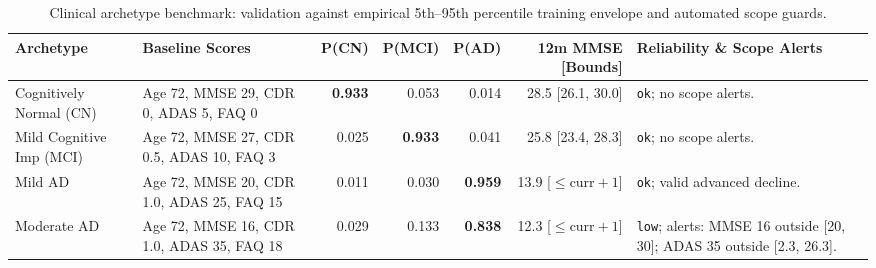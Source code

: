\begin{table}[t]
\centering
\caption{Clinical archetype benchmark: validation against empirical 5th--95th percentile training envelope and automated scope guards.}
\label{tab:archetype_plausibility}
\small
\begin{adjustbox}{max width=\linewidth}
\begin{tabular}{lp{3.2cm}rrrrp{3.5cm}}
\toprule
\textbf{Archetype} & \textbf{Baseline Scores} & \textbf{P(CN)} & \textbf{P(MCI)} & \textbf{P(AD)} & \textbf{12m MMSE [Bounds]} & \textbf{Reliability \& Scope Alerts} \\
\midrule
Cognitively Normal (CN) & Age 72, MMSE 29, CDR 0, ADAS 5, FAQ 0   & \textbf{0.933} & 0.053 & 0.014 & 28.5 [26.1, 30.0] & \texttt{ok}; no scope alerts. \\
Mild Cognitive Imp (MCI)& Age 72, MMSE 27, CDR 0.5, ADAS 10, FAQ 3 & 0.025 & \textbf{0.933} & 0.041 & 25.8 [23.4, 28.3] & \texttt{ok}; no scope alerts. \\
Mild AD                 & Age 72, MMSE 20, CDR 1.0, ADAS 25, FAQ 15& 0.011 & 0.030 & \textbf{0.959} & 13.9 [$\le \text{curr}+1$] & \texttt{ok}; valid advanced decline. \\
Moderate AD             & Age 72, MMSE 16, CDR 1.0, ADAS 35, FAQ 18& 0.029 & 0.133 & \textbf{0.838} & 12.3 [$\le \text{curr}+1$] & \texttt{low}; alerts: MMSE 16 outside [20, 30]; ADAS 35 outside [2.3, 26.3]. \\
\bottomrule
\end{tabular}
\end{adjustbox}
\end{table}
